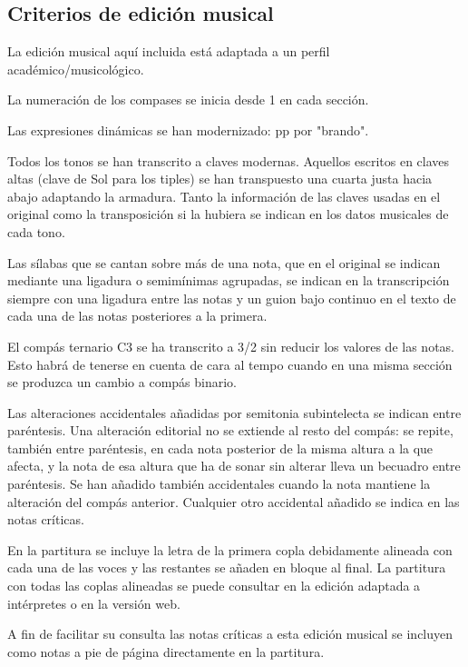 \subsection*{Criterios de edición musical}
\noindent La edición musical aquí incluida está adaptada a un perfil académico/musicológico.

\noindent La numeración de los compases se inicia desde 1 en cada sección.

\noindent Las expresiones dinámicas se han modernizado: pp por "brando".

\noindent Todos los tonos se han transcrito a claves modernas. Aquellos escritos en claves altas (clave de Sol para los tiples) se han transpuesto una cuarta justa hacia abajo adaptando la armadura. Tanto la información de las claves usadas en el original como la transposición si la hubiera se indican en los datos musicales de cada tono.

\noindent Las sílabas que se cantan sobre más de una nota, que en el original se indican mediante una ligadura o semimínimas agrupadas, se indican en la transcripción siempre con una ligadura entre las notas y un guion bajo continuo en el texto de cada una de las notas posteriores a la primera. 

\noindent El compás ternario C3 se ha transcrito a 3/2 sin reducir los valores de las notas. Esto habrá de tenerse en cuenta de cara al tempo cuando en una misma sección se produzca un cambio a compás binario.

\noindent Las alteraciones accidentales añadidas por semitonia subintelecta se indican entre paréntesis. Una alteración editorial no se extiende al resto del compás: se repite, también entre paréntesis, en cada nota posterior de la misma altura a la que afecta, y la nota de esa altura que ha de sonar sin alterar lleva un becuadro entre paréntesis. Se han añadido también accidentales cuando la nota mantiene la alteración del compás anterior. Cualquier otro accidental añadido se indica en las notas críticas.

\noindent En la partitura se incluye la letra de la primera copla debidamente alineada con cada una de las voces y las restantes se añaden en bloque al final. La partitura con todas las coplas alineadas se puede consultar en la edición adaptada a intérpretes o en la versión web. 

\noindent A fin de facilitar su consulta las notas críticas a esta edición musical se incluyen como notas a pie de página directamente en la partitura.

